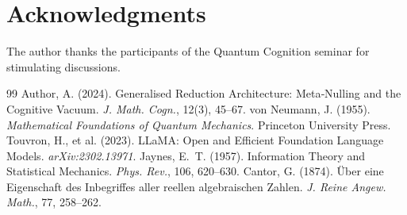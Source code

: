 \documentclass[11pt]{article}
\begin{document}
\section*{Acknowledgments}
The author thanks the participants of the Quantum Cognition seminar for stimulating discussions.

\begin{thebibliography}{99}
 Author, A. (2024). Generalised Reduction Architecture: Meta‑Nulling and the Cognitive Vacuum. \textit{J. Math. Cogn.}, 12(3), 45--67.
 von Neumann, J. (1955). \textit{Mathematical Foundations of Quantum Mechanics}. Princeton University Press.
 Touvron, H., et al. (2023). LLaMA: Open and Efficient Foundation Language Models. \textit{arXiv:2302.13971}.
 Jaynes, E.~T. (1957). Information Theory and Statistical Mechanics. \textit{Phys. Rev.}, 106, 620--630.
 Cantor, G. (1874). \"Uber eine Eigenschaft des Inbegriffes aller reellen algebraischen Zahlen. \textit{J. Reine Angew. Math.}, 77, 258--262.
\end{thebibliography}
\end{document}
